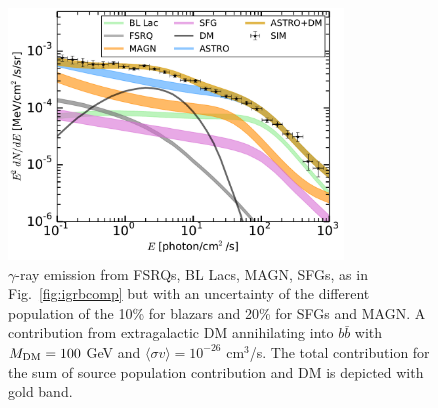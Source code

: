 \documentclass[12 pt]{article}
\begin{document}
\begin{figure} %
 \centering
  \includegraphics[width=3.5in]{money_plot_proposal.pdf} 
   \caption{$\gamma$-ray emission from FSRQs, BL Lacs, MAGN, SFGs, as in Fig.~\ref{fig:igrbcomp} but with an uncertainty of the different population of the 10\% for blazars and 20\% for SFGs and MAGN. A contribution from extragalactic DM annihilating into $b\bar{b}$ with $M_{\rm{DM}}=100$ GeV and $\langle \sigma v \rangle = 10^{-26}$ cm$^3$/s. The total contribution for the sum of source population contribution and DM is depicted with gold band.}
   \label{fig:moneyplot}
\end{figure}




\vspace{-0.5cm}
\end{document}
